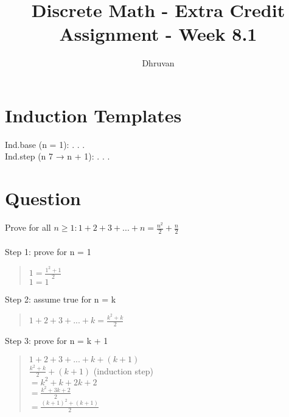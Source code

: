 \documentclass{article}
\begin{document}
\title{Discrete Math - Extra Credit Assignment - Week 8.1} %
\author{Dhruvan}
\date{}
\maketitle

\section*{Induction Templates}
Ind.base (n = 1): . . . \\
Ind.step (n 7 → n + 1): . . . \\


\section{Question}
Prove for all \({n ≥ 1: 1 + 2 + 3 + ... + n = \frac{n^2}{2} + \frac{n}{2}}\) \\ \\
Step 1: prove for n = 1 \\
\begin{quote}
\(1 = \frac{1^2 + 1}{2}\) \\
\(1 = 1\)
\end{quote}

Step 2: assume true for n = k \\
\begin{quote}
\(1 + 2 + 3 + ... + k = \frac{k^2 + k}{2}\)
\end{quote}

Step 3: prove for n = k + 1 \\
\begin{quote}
\(1 + 2 + 3 + ... + k + (k + 1)\) \\
\(\frac{k^2 + k}{2} + (k + 1)\) (induction step) \\
\(= {k^2 + k + 2k + 2}\) \\
\(= \frac{k^2 + 3k + 2}{2}\) \\
\(= \frac{(k+1)^2 + (k+1)}{2}\)
\end{quote}

\end{document}
